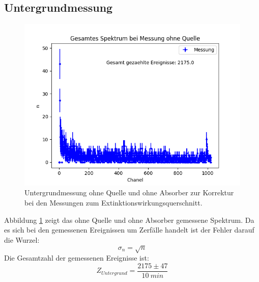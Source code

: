 \documentclass[12pt,a4paper]{article}
\begin{document}
\subsection{Untergrundmessung}
\begin{figure}
\centering
\includegraphics[scale=0.8]{Bilder/Extinktion/Rauschmessung.png}
\caption{Untergrundmessung ohne Quelle und ohne Absorber zur Korrektur bei den Messungen zum Extinktionswirkungsquerschnitt.}
\label{fig:Extinktion_Rauschmessung}
\end{figure}

Abbildung \ref{fig:Extinktion_Rauschmessung} zeigt das ohne Quelle und ohne Absorber gemessene Spektrum. Da es sich bei den gemessenen Ereignissen um Zerfälle handelt ist der Fehler darauf die Wurzel:
\begin{equation*}
\sigma _{n} = \sqrt{n}
\end{equation*}
Die Gesamtzahl der gemessenen Ereignisse ist:
\begin{equation*}
Z_{Untergrund} = \dfrac{2175 \pm 47}{\SI{10}{min}}
\end{equation*}
\end{document}

